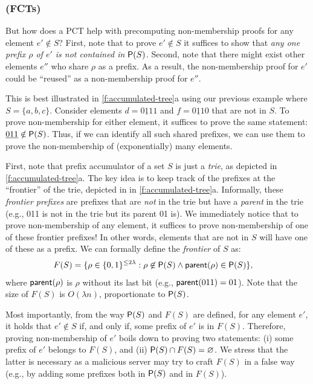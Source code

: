 \subsubsection{\frontierCommunionTree (FCTs)}
\label{s:aas:from-bilinear-acc:fct}
But how does a PCT help with precomputing non-membership proofs for any element $e'\notin S$?
First, note that to prove $e'\notin S$ it suffices to show that \textit{any one prefix $\rho$ of $e'$ is not contained in $\mathsf{P}(S)$}.
Second, note that there might exist other elements $e''$ who share $\rho$ as a prefix.
As a result, the non-membership proof for $e'$ could be ``reused'' as a non-membership proof for $e''$.

This is best illustrated in \cref{f:accumulated-tree}a using our previous example where $S =\{a,b,c\}$.
Consider elements $d= \underline{011}1$ and $f = \underline{011}0$ that are not in $S$.
To prove non-membership for either element, it suffices to prove the same statement: $\underline{011}\notin \mathsf{P}(S)$.
Thus, if we can identify all such shared prefixes, we can use them to prove the non-membership of (exponentially) many elements.

First, note that prefix accumulator of a set $S$ is just a \textit{trie}, as depicted in \cref{f:accumulated-tree}a.
The key idea is to keep track of the prefixes at the ``frontier'' of the trie, depicted in  in \cref{f:accumulated-tree}a.
Informally, these \textit{frontier prefixes} are prefixes that are \textit{not} in the trie but have a \textit{parent} in the trie (e.g., 011 is not in the trie but its parent 01 is).
We immediately notice that to prove non-membership of any element, it suffices to prove non-membership of one of these frontier prefixes!
In other words, elements that are not in $S$ will have one of these as a prefix.
We can formally define the \textit{frontier} of $S$ as:
\begin{align*}
    F(S) &= \{\rho \in \{0,1\}^{\le 2\lambda}: {\rho\not \in \mathsf{P}(S)} \wedge {\ensuremath{\mathsf{parent}}(\rho) \in \ensuremath{\mathsf{P}}(S)}\}\text{,}
\end{align*}
where $\mathsf{parent}(\rho)$ is $\rho$ without its last bit (e.g., $\mathsf{parent}(011) = 01$).
Note that the size of $F(S)$ is $O(\lambda n)$, proportionate to $\mathsf{P}(S)$.

Most importantly, from the way $\mathsf{P}(S)$ and $F(S)$ are defined, for any element $e'$, it holds that $e'\not\in S$ if, and only if, some prefix of $e'$ is in $F(S)$. 
Therefore, proving non-membership of $e'$ boils down to proving two statements: (i) some prefix of $e'$ belongs to $F(S)$, and (ii) $\mathsf{P}(S) \cap F(S) = \varnothing$.
We stress that the latter is necessary as a malicious server may try to craft $F(S)$ in a false way (e.g., by adding some prefixes both in $\mathsf{P}(S)$ and in $F(S)$).

